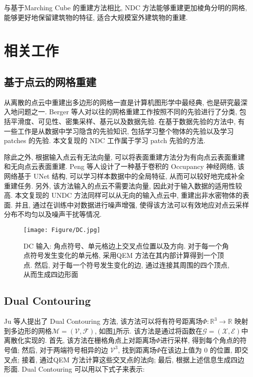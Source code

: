 与基于Marching Cube \cite{lorensen1987marching}的重建方法相比, NDC 方法能够重建更加棱角分明的网格, 能够更好地保留建筑物的特征, 适合大规模室外建筑物的重建. 

\section{相关工作}

\subsection{基于点云的网格重建}

从离散的点云中重建出多边形的网格一直是计算机图形学中最经典, 也是研究最深入地问题之一. 
Berger 等人\cite{berger2017survey}对以往的网格重建工作按照不同的先验进行了分类, 包括平滑度、可见性、密集采样、基元以及数据先验. 
在基于数据先验的方法中, 有一些工作是从数据中学习隐含的先验知识, 包括学习整个物体的先验\cite{peng2021shape}以及学习 patches 的先验\cite{Shen:2012}. 
本文复现的 NDC 工作属于学习 patch 先验的方法.

除此之外, 根据输入点云有无法向量, 可以将表面重建方法分为有向点云表面重建\cite{kazhdan2006poisson}和无向点云表面重建\cite{atzmon2020sal}. 
Peng 等人\cite{tang2021sa}设计了一种基于卷积的 Occupancy 神经网络, 该网络基于 UNet \cite{ronneberger2015u}结构, 可以学习样本数据中的全局特征, 从而可以较好地完成补全重建任务. 
另外, 该方法输入的点云不需要法向量, 因此对于输入数据的适用性较高. 本文复现的 UNDC 方法同样可以从无向的输入点云中, 重建出非水密物体的表面. 
并且, 通过在训练中对数据进行噪声增强, 使得该方法可以有效地应对点云采样分布不均匀以及噪声干扰等情况. 

\begin{figure}[H]
	\center
	\texttt{[image: Figure/DC.jpg]}
	\centering
	\caption{DC 输入: 角点符号、单元格边上交叉点位置以及方向. 对于每一个角点符号发生变化的单元格, 采用QEM 方法在其内部计算得到一个顶点. 
		然后, 对于每一个符号发生变化的边, 通过连接其周围的四个顶点, 从而生成四边形面}\label{fig:dc}
\end{figure}

\subsection{Dual Contouring}

Ju 等人\cite{ju2002dual}提出了 Dual Contouring 方法, 该方法可以将有符号距离场$\Phi:\mathbb{R}^3\rightarrow \mathbb{R}$ 映射到多边形的网格$\mathcal{M=(V,F)}$, 如图\ref{fig:dc}所示. 
该方法是通过将函数在$\mathcal{G=(X,E)}$中离散化实现的. 
首先, 该方法在栅格角点上对距离场$\Phi$进行采样, 得到每个角点的符号值; 
然后, 对于两端符号相异的边 $\mathcal{V}^3$, 找到距离场$\Phi$在该边上值为 0 的位置, 即交叉点; 
接着, 通过QEM 方法计算这些交叉点的法向; 
最后, 根据上述信息生成四边形面. Dual Contouring 可以用以下式子来表示: \\

